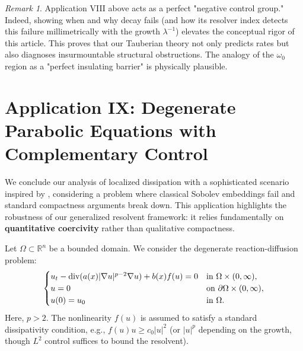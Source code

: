 \documentclass[11pt,reqno]{amsart}
\theoremstyle{remark}
\newtheorem{remark}[theorem]{Remark}
\begin{document}
\begin{remark}
 Application VIII above acts as a perfect "negative control group." Indeed, showing when and why decay fails (and how its resolver index detects this failure millimetrically with the growth $\lambda^{-1}$) elevates the conceptual rigor of this article. This proves that our Tauberian theory not only predicts rates but also diagnoses insurmountable structural obstructions. The analogy of the $\omega_0$ region as a "perfect insulating barrier" is physically plausible.%

\end{remark}

















\section{Application IX: Degenerate Parabolic Equations with Complementary Control}
\label{sec:degenerate_complementary}

We conclude our analysis of localized dissipation with a sophisticated scenario inspired by \cite{Examples2022}, considering a problem where classical Sobolev embeddings fail and standard compactness arguments break down. This application highlights the robustness of our generalized resolvent framework: it relies fundamentally on \textbf{quantitative coercivity} rather than qualitative compactness.

Let $\Omega \subset \mathbb{R}^n$ be a bounded domain. We consider the degenerate reaction-diffusion problem:
\begin{equation} \label{eq:deg_interaction}
\begin{cases}
u_{t} - \hbox{div}(a(x)|\nabla u|^{p-2}\nabla u) + b(x)f(u) = 0 & \text{in } \Omega \times (0, \infty), \\
u = 0 & \text{on } \partial\Omega \times (0, \infty), \\
u(0) = u_0 & \text{in } \Omega.
\end{cases}
\end{equation}
Here, $p > 2$. The nonlinearity $f(u)$ is assumed to satisfy a standard dissipativity condition, e.g., $f(u)u \ge c_0 |u|^2$ (or $|u|^p$ depending on the growth, though $L^2$ control suffices to bound the resolvent).
\end{document}
